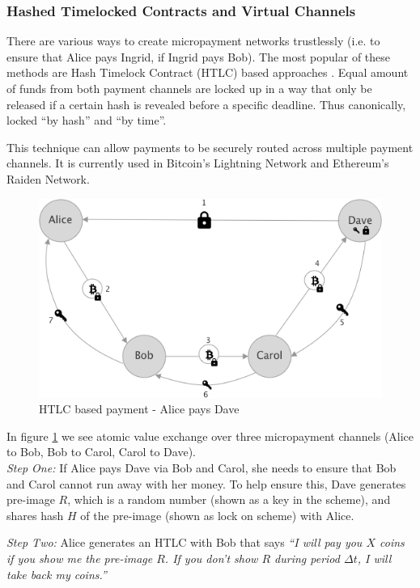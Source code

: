 \documentclass[a4paper,12pt]{article}
\begin{document}
\subsubsection{Hashed Timelocked Contracts and Virtual Channels}

There are various ways to create micropayment networks trustlessly (i.e. to ensure 
that Alice pays Ingrid, if Ingrid pays Bob). The most popular of these methods are 
Hash Timelock Contract (HTLC) based approaches \cite{lightning}. Equal amount of 
funds from both payment channels are locked up in a way that only be released if 
a certain hash is revealed before a specific deadline. Thus canonically, locked 
“by hash” and “by time”.

This technique can allow payments to be securely routed across multiple payment 
channels. It is currently used in Bitcoin’s Lightning Network and Ethereum’s Raiden 
Network.

\begin{figure}[H]
    \centering
    \includegraphics[scale=0.5]{../img/htlc}
    \caption{HTLC based payment - Alice pays Dave}
    \label{img:htlc}
\end{figure}

In figure \ref{img:htlc} we see atomic value exchange over three micropayment 
channels (Alice to Bob, Bob to Carol, Carol to Dave).\\

\textit{Step One:}
If Alice pays Dave via Bob and Carol, she needs to ensure that Bob and Carol cannot
run away with her money. To help ensure this, Dave generates pre-image $R$, which is 
a random number (shown as a key in the scheme), and shares hash $H$ of the pre-image 
(shown as lock on scheme) with Alice. 

\textit{Step Two:}
Alice generates an HTLC with Bob that says \textit{“I will pay you $X$ coins if you 
show me the pre-image $R$. If you don’t show $R$ during period $\Delta t$, I will 
take back my coins.”}
\end{document}
